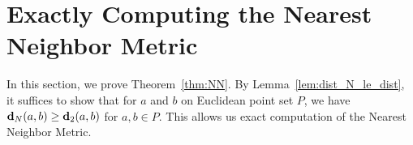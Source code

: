 \section{Exactly Computing the Nearest Neighbor Metric}
\label{sec:NN}
In this section, we prove Theorem~\ref{thm:NN}. By
Lemma~\ref{lem:dist_N_le_dist}, it suffices to show that for $a$ and $b$
on Euclidean point set $P$, we have $\mathbf{d}_N(a, b) \geq \mathbf{d}_2(a,b)$ for $a, b
\in P$. This allows us exact computation of the Nearest Neighbor Metric.

